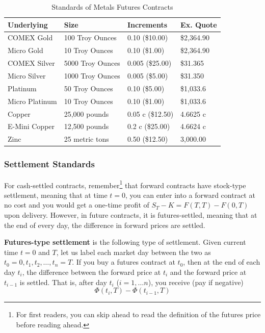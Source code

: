 \documentclass{article}
\begin{document}
      \begin{table}[H]
        \centering
        \begin{tabular}{|l|l|l|l|}
        \hline
        \textbf{Underlying} & \textbf{Size} & \textbf{Increments} & \textbf{Ex. Quote} \\ \hline
        COMEX Gold & 100 Troy Ounces & 0.10 (\$10.00) & \$2,364.90 \\ \hline 
        Micro Gold & 10 Troy Ounces & 0.10 (\$1.00) & \$2,364.90 \\ \hline
        COMEX Silver & 5000 Troy Ounces & 0.005 (\$25.00) & \$31.365 \\ \hline 
        Micro Silver & 1000 Troy Ounces & 0.005 (\$5.00) & \$31.350 \\ \hline 
        Platinum & 50 Troy Ounces & 0.10 (\$5.00) & \$1,033.6 \\ \hline 
        Micro Platinum & 10 Troy Ounces & 0.10 (\$1.00) & \$1,033.6 \\ \hline 
        Copper & 25,000 pounds & 0.05 c (\$12.50) & 4.6625 c \\ \hline
        E-Mini Copper & 12,500 pounds & 0.2 c (\$25.00) & 4.6624 c \\ \hline
        Zinc & 25 metric tons & 0.50 (\$12.50) & 3,000.00 \\ \hline
        \end{tabular}
        \caption{Standards of Metals Futures Contracts}
        \label{tab:metals}
      \end{table}

    \subsubsection{Settlement Standards}

      For cash-settled contracts, remember\footnote{For first readers, you can skip ahead to read the definition of the futures price before reading ahead.} that forward contracts have stock-type settlement, meaning that at time $t = 0$, you can enter into a forward contract at no cost and you would get a one-time profit of $S_T - K = F(T, T) - F(0, T)$ upon delivery. However, in future contracts, it is futures-settled, meaning that at the end of every day, the difference in forward prices are settled. 

      \begin{definition}
        \label{def:futures-type-settlement}
        \textbf{Futures-type settlement} is the following type of settlement. Given current time $t = 0$ and $T$, let us label each market day between the two as $t_0 = 0, t_1, t_2, \ldots, t_n = T$. If you buy a futures contract at $t_0$, then at the end of each day $t_i$, the difference between the forward price at $t_i$ and the forward price at $t_{i-1}$ is settled. That is, after day $t_i$ ($i = 1, \ldots n$), you receive (pay if negative) 
        \begin{equation}
          \Phi(t_i, T) - \Phi(t_{i-1}, T)
        \end{equation}
      \end{definition}
\end{document}
